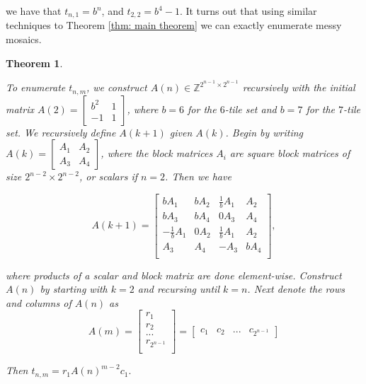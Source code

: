 \documentclass[12pt]{article}
\theoremstyle{plain}
\newtheorem{thm}{Theorem}
\theoremstyle{definition}
\theoremstyle{remark}
\theoremstyle{definition}
\newcommand{\cellA}[4]{ \draw[thick] ( #1 , #2 ) rectangle ( #3 , #4 ); \draw[red, thick, densely dotted] (#3 * 0.5 + #1 * 0.5 , #2) -- (#3, #4 * 0.5 + #2 * 0.5);}
\newcommand{\cellB}[4]{ \draw[thick] ( #1 , #2 ) rectangle ( #3 , #4 ); \draw[red, thick, densely dotted] (#3 * 0.5 + #1 * 0.5 , #2) -- (#1, #4 * 0.5 + #2 * 0.5);}
\newcommand{\cellC}[4]{ \draw[thick] ( #1 , #2 ) rectangle ( #3 , #4 ); \draw[red, thick, densely dotted] (#3 * 0.5 + #1 * 0.5 , #4) -- (#1, #4 * 0.5 + #2 * 0.5);}
\newcommand{\cellD}[4]{ \draw[thick] ( #1 , #2 ) rectangle ( #3 , #4 ); \draw[red, thick, densely dotted] (#3 * 0.5 + #1 * 0.5 , #4) -- (#3, #4 * 0.5 + #2 * 0.5);}
\begin{document}
\begin{center}
\end{center}

we have that $t_{n,1}=b^n$, and $t_{2,2} = b^4 - 1$. It turns out that using similar techniques to Theorem \ref{thm: main theorem} we can exactly enumerate messy mosaics. 

\begin{thm}
\label{thm: messy mosaics}

To enumerate $t_{n,m}$, we construct $A(n) \in \mathbb{Z}^{2^{n-1} \times 2^{n-1}}$ recursively with the initial matrix $
A(2) = \begin{bmatrix}
b^2 & 1 \\
-1 & 1
\end{bmatrix}
$, where $b = 6$ for the $6$-tile set and $b = 7$ for the $7$-tile set. We recursively define $A(k+1)$ given $A(k)$. Begin by writing
$
A(k) = \begin{bmatrix}
A_1 & A_2 \\
A_3 & A_4
\end{bmatrix}
$, where the block matrices $A_i$ are square block matrices of size $2^{n-2} \times 2^{n-2}$, or scalars if $n=2$. Then we have

$$
A(k+1) = \begin{bmatrix}
    bA_1 & bA_2 & \frac{1}{b}A_1 & A_2 \\
    bA_3 & bA_4 & 0A_3 & A_4 \\
    -\frac{1}{b}A_1 & 0A_2 & \frac{1}{b}A_1 & A_2 \\
    A_3 & A_4 & -A_3 & bA_4 \\
\end{bmatrix},
$$

where products of a scalar and block matrix are done element-wise. Construct $A(n)$ by starting with $k=2$ and recursing until $k=n$. Next denote the rows and columns of $A(n)$ as
$$
A(m) = 
\begin{bmatrix}
    r_1 \\
    r_2 \\
    ... \\
    r_{2^{n-1}} \\
\end{bmatrix} = 
\begin{bmatrix}
    c_1 & c_2 & ... & c_{2^{n-1}}
\end{bmatrix}
$$

Then $t_{n,m} = r_1 A(n)^{m-2}c_1 .$

\end{thm}
\end{document}

